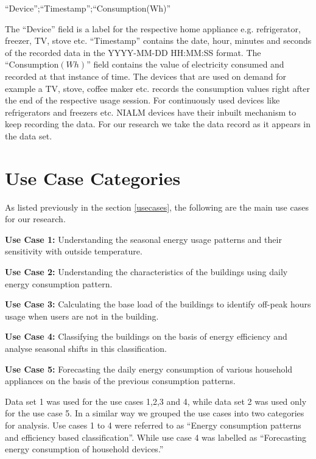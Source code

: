 ``Device'';``Timestamp'';``Consumption(Wh)''

The ``Device'' field is a label for the respective home appliance e.g. refrigerator, freezer, TV, stove etc. ``Timestamp'' contains the date, hour, minutes and seconds of the recorded data in the  YYYY-MM-DD HH:MM:SS format. The ``Consumption\((Wh)\)'' field contains the value of electricity consumed and recorded at that instance of time. The devices that are used on demand for example a TV, stove, coffee maker etc. records the consumption values right after the end of the respective usage session. For continuously used devices like refrigerators and freezers etc. NIALM devices have their inbuilt mechanism to keep recording the data. For our research we take the data record as it appears in the data set.   

\section{Use Case Categories}

As listed previously in the section \ref{usecases}, the following are the main use cases for our research.

\textbf{Use Case 1:} Understanding the seasonal energy usage patterns and their sensitivity with outside temperature.

\textbf{Use Case 2:} Understanding the characteristics of the buildings using daily energy consumption pattern.

\textbf{Use Case 3:} Calculating the base load of the buildings to identify off-peak hours usage when users are not in the building.

\textbf{Use Case 4:} Classifying the buildings on the basis of energy efficiency and analyse seasonal shifts in this classification.

\textbf{Use Case 5:} Forecasting the daily energy consumption of various household appliances on the basis of the previous consumption patterns.

Data set 1 was used for the use cases 1,2,3 and 4, while data set 2 was used only for the use case 5. In a similar way we grouped the use cases into two categories for analysis. Use cases 1 to 4 were referred to as ``Energy consumption patterns and efficiency based classification''. While use case 4 was labelled as ``Forecasting energy consumption of household devices.''


